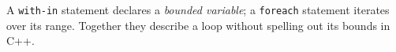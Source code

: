 A \texttt{with-in} statement declares a \emph{bounded variable}; a \texttt{foreach} statement iterates over its range. Together they describe a loop without spelling out its bounds in C++.
